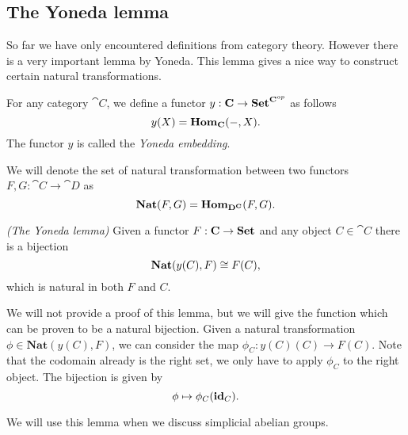 \subsection{The Yoneda lemma}
So far we have only encountered definitions from category theory. However there is a very important lemma by Yoneda. This lemma gives a nice way to construct certain natural transformations.

\begin{definition}
	For any category $\cat{C}$, we define a functor $y:\mathbf{C} \to \mathbf{Set}^{\mathbf{C}^{op}}$ as follows
	$$ y(X) = \mathbf{Hom}_{\mathbf{C}}(-, X). $$
	The functor $y$ is called the \emph{Yoneda embedding}.
\end{definition}

We will denote the set of natural transformation between two functors $F, G: \cat{C} \to \cat{D}$ as
$$ \mathbf{Nat}(F, G) = \mathbf{Hom}_{\mathbf{D}^{\mathbf{C}}}(F, G). $$

\begin{lemma}\emph{(The Yoneda lemma)}
	Given a functor $F: \mathbf{C} \to \mathbf{Set}$ and any object $C \in \cat{C}$ there is a bijection
	$$ \mathbf{Nat}(y(C), F) \cong F(C), $$
	which is natural in both $F$ and $C$.
\end{lemma}

We will not provide a proof of this lemma, but we will give the function which can be proven to be a natural bijection. Given a natural transformation $\phi \in \mathbf{Nat}(y(C), F)$, we can consider the map $\phi_C : y(C)(C) \to F(C)$. Note that the codomain already is the right set, we only have to apply $\phi_C$ to the right object. The bijection is given by
$$ \phi \mapsto \phi_C(\mathbf{id}_C). $$

We will use this lemma when we discuss simplicial abelian groups.